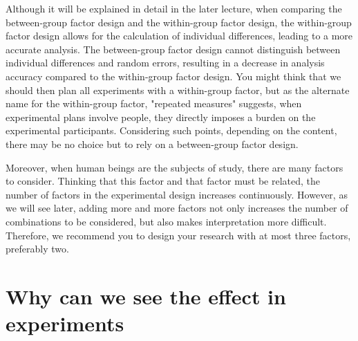 \documentclass{ltjbook}
\begin{document}
Although it will be explained in detail in the later lecture, when comparing the between-group factor design and the within-group factor design, the within-group factor design allows for the calculation of individual differences, leading to a more accurate analysis. The between-group factor design cannot distinguish between individual differences and random errors, resulting in a decrease in analysis accuracy compared to the within-group factor design. You might think that we should then plan all experiments with a within-group factor, but as the alternate name for the within-group factor, "repeated measures" suggests, when experimental plans involve people, they directly imposes a burden on the experimental participants. Considering such points, depending on the content, there may be no choice but to rely on a between-group factor design.

Moreover, when human beings are the subjects of study, there are many factors to consider. Thinking that this factor and that factor must be related, the number of factors in the experimental design increases continuously. However, as we will see later, adding more and more factors not only increases the number of combinations to be considered, but also makes interpretation more difficult. Therefore, we recommend you to design your research with at most three factors, preferably two.

\section{Why can we see the effect in experiments}
\end{document}
